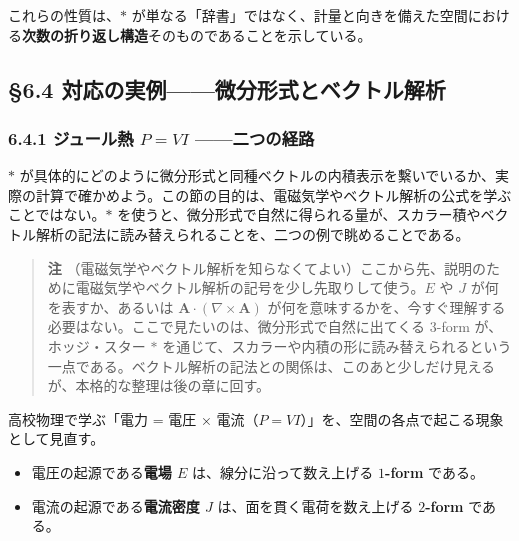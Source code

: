 \documentclass[a4paper,12pt,openany]{book}
\begin{document}
これらの性質は、\(\ast\)
が単なる「辞書」ではなく、計量と向きを備えた空間における\textbf{次数の折り返し構造}そのものであることを示している。

\par\vspace{0.35em}\par

\hypertarget{ux5bfeux5fdcux306eux5b9fux4f8bux5faeux5206ux5f62ux5f0fux3068ux30d9ux30afux30c8ux30ebux89e3ux6790}{%
\subsection{§6.4
対応の実例——微分形式とベクトル解析}\label{ux5bfeux5fdcux306eux5b9fux4f8bux5faeux5206ux5f62ux5f0fux3068ux30d9ux30afux30c8ux30ebux89e3ux6790}}

\hypertarget{ux30b8ux30e5ux30fcux30ebux71b1-pvi-ux4e8cux3064ux306eux7d4cux8def}{%
\subsubsection{\texorpdfstring{6.4.1 ジュール熱 \(P=VI\)
——二つの経路}{6.4.1 ジュール熱 P=VI ——二つの経路}}\label{ux30b8ux30e5ux30fcux30ebux71b1-pvi-ux4e8cux3064ux306eux7d4cux8def}}

\(\ast\)
が具体的にどのように微分形式と同種ベクトルの内積表示を繫いでいるか、実際の計算で確かめよう。この節の目的は、電磁気学やベクトル解析の公式を学ぶことではない。\(\ast\)
を使うと、微分形式で自然に得られる量が、スカラー積やベクトル解析の記法に読み替えられることを、二つの例で眺めることである。

\begin{quote}
\textbf{注}
（電磁気学やベクトル解析を知らなくてよい）ここから先、説明のために電磁気学やベクトル解析の記号を少し先取りして使う。\(E\)
や \(J\) が何を表すか、あるいは
\(\mathbf{A}\cdot(\nabla\times\mathbf{A})\)
が何を意味するかを、今すぐ理解する必要はない。ここで見たいのは、微分形式で自然に出てくる
\(3\)-form が、ホッジ・スター \(\ast\)
を通じて、スカラーや内積の形に読み替えられるという一点である。ベクトル解析の記法との関係は、このあと少しだけ見えるが、本格的な整理は後の章に回す。
\end{quote}

高校物理で学ぶ「電力 = 電圧 ×
電流（\(P=VI\)）」を、空間の各点で起こる現象として見直す。

\begin{itemize}
\item
  電圧の起源である\textbf{電場 $E$} は、線分に沿って数え上げる
  \textbf{$1$-form} である。
\item
  電流の起源である\textbf{電流密度 $J$} は、面を貫く電荷を数え上げる
  \textbf{$2$-form} である。
\end{itemize}
\end{document}
